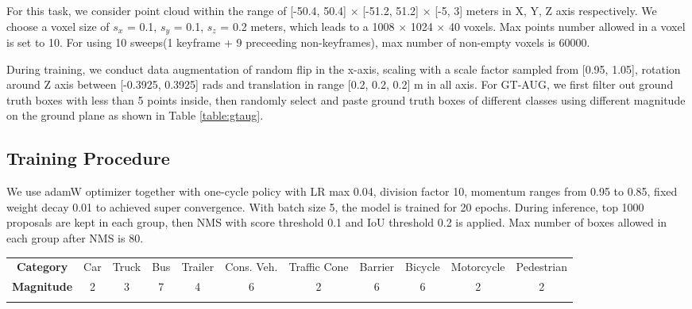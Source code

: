 \documentclass[10pt,twocolumn,letterpaper]{article}
\begin{document}
For this task, we consider point cloud within the range of [-50.4, 50.4] $\times$ [-51.2, 51.2] $\times$ [-5, 3] meters in X, Y, Z axis respectively. We choose a voxel size of $s_x$ = 0.1, $s_y$ = 0.1, $s_z$ = 0.2 meters, which leads to a 1008 $\times$ 1024 $\times$ 40 voxels. Max points number allowed in a voxel is set to 10. For using 10 sweeps(1 keyframe + 9 preceeding non-keyframes), max number of non-empty voxels is 60000. 

During training, we conduct data augmentation of random flip in the x-axis, scaling with a scale factor sampled from [0.95, 1.05], rotation around Z axis between [-0.3925, 0.3925] rads and translation in range [0.2, 0.2, 0.2] m in all axis. For GT-AUG, we first filter out ground truth boxes with less than 5 points inside, then randomly select and paste ground truth boxes of different classes using different magnitude on the ground plane as shown in Table \ref{table:gtaug}.



\subsection{Training Procedure}
We use adamW \cite{DBLP:journals/corr/abs-1711-05101} optimizer together with one-cycle policy \cite{OneCyclePolicySylvainGugger} with LR max 0.04, division factor 10, momentum ranges from 0.95 to 0.85, fixed weight decay 0.01 to achieved super convergence. With batch size 5, the model is trained for 20 epochs. During inference, top 1000 proposals are kept in each group, then NMS with score threshold 0.1 and IoU threshold 0.2 is applied. Max number of boxes allowed in each group after NMS is 80. 


\begin{table*}[t] 
\begin{center}    
\begin{tabular}{c|c|c|c|c|c|c|c|c|c|c}
    \Xhline{0.8pt}
    \textbf{Category} & Car & Truck & Bus & Trailer & Cons. Veh. & Traffic Cone & Barrier & Bicycle & Motorcycle & Pedestrian \\
    \Xhline{0.8pt}

    \textbf{Magnitude} & 2 & 3 & 7 & 4 & 6 & 2 & 6 & 6 & 2 & 2 \\
    \Xhline{0.8pt}
\end{tabular}
\end{center}
\caption{\textbf{GT-AUG magnitudes of different categories.} For each category, the magnitude means number of instances placed into a point cloud sample.}
\label{table:gtaug}
\end{table*}
\end{document}
